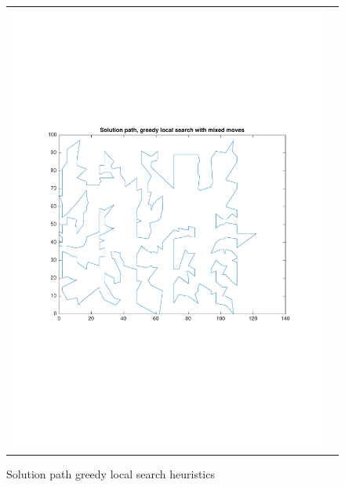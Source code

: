 \documentclass[a4paper, 11pt]{scrartcl}
\begin{document}
\begin{figure}[!ht]
\begin{tabular}{cc}
    \includegraphics[scale=0.4, trim={3cm 6cm 1cm 6cm}]{../figures/solutionPath_mixed.pdf}
  \end{tabular}
  \caption{Solution path greedy local search heuristics}
  \label{fig:solpath-GLS}
\end{figure}
\end{document}
